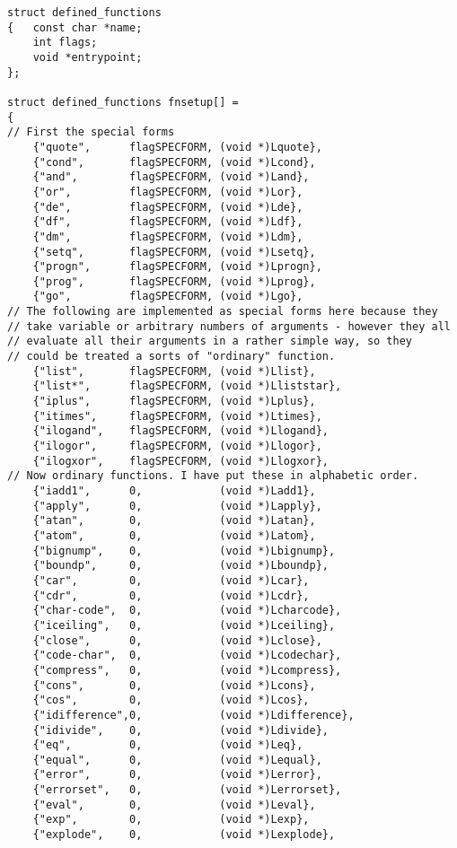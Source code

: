 {\begin{verbatim}
struct defined_functions
{   const char *name;
    int flags;
    void *entrypoint;
};

struct defined_functions fnsetup[] =
{
// First the special forms
    {"quote",      flagSPECFORM, (void *)Lquote},
    {"cond",       flagSPECFORM, (void *)Lcond},
    {"and",        flagSPECFORM, (void *)Land},
    {"or",         flagSPECFORM, (void *)Lor},
    {"de",         flagSPECFORM, (void *)Lde},
    {"df",         flagSPECFORM, (void *)Ldf},
    {"dm",         flagSPECFORM, (void *)Ldm},
    {"setq",       flagSPECFORM, (void *)Lsetq},
    {"progn",      flagSPECFORM, (void *)Lprogn},
    {"prog",       flagSPECFORM, (void *)Lprog},
    {"go",         flagSPECFORM, (void *)Lgo},
// The following are implemented as special forms here because they
// take variable or arbitrary numbers of arguments - however they all
// evaluate all their arguments in a rather simple way, so they
// could be treated a sorts of "ordinary" function.
    {"list",       flagSPECFORM, (void *)Llist},
    {"list*",      flagSPECFORM, (void *)Lliststar},
    {"iplus",      flagSPECFORM, (void *)Lplus},
    {"itimes",     flagSPECFORM, (void *)Ltimes},
    {"ilogand",    flagSPECFORM, (void *)Llogand},
    {"ilogor",     flagSPECFORM, (void *)Llogor},
    {"ilogxor",    flagSPECFORM, (void *)Llogxor},
// Now ordinary functions. I have put these in alphabetic order.
    {"iadd1",      0,            (void *)Ladd1},
    {"apply",      0,            (void *)Lapply},
    {"atan",       0,            (void *)Latan},
    {"atom",       0,            (void *)Latom},
    {"bignump",    0,            (void *)Lbignump},
    {"boundp",     0,            (void *)Lboundp},
    {"car",        0,            (void *)Lcar},
    {"cdr",        0,            (void *)Lcdr},
    {"char-code",  0,            (void *)Lcharcode},
    {"iceiling",   0,            (void *)Lceiling},
    {"close",      0,            (void *)Lclose},
    {"code-char",  0,            (void *)Lcodechar},
    {"compress",   0,            (void *)Lcompress},
    {"cons",       0,            (void *)Lcons},
    {"cos",        0,            (void *)Lcos},
    {"idifference",0,            (void *)Ldifference},
    {"idivide",    0,            (void *)Ldivide},
    {"eq",         0,            (void *)Leq},
    {"equal",      0,            (void *)Lequal},
    {"error",      0,            (void *)Lerror},
    {"errorset",   0,            (void *)Lerrorset},
    {"eval",       0,            (void *)Leval},
    {"exp",        0,            (void *)Lexp},
    {"explode",    0,            (void *)Lexplode},

\end{verbatim}}
